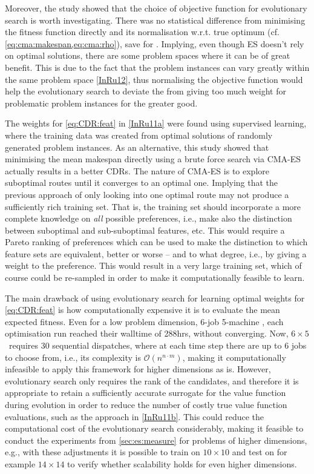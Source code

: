 Moreover, the study showed that the choice of objective function  for 
evolutionary search is worth investigating. There was no statistical difference 
from minimising the fitness function directly and its normalisation w.r.t. true 
optimum (cf. \cref{eq:cma:makespan,eq:cma:rho}), save for . 
Implying, even though ES doesn't rely on optimal solutions, there are some 
problem spaces where it can be of great benefit. This is due to the fact that 
the problem instances can vary greatly within the same problem space 
\cref{InRu12}, thus normalising the objective function would help the 
evolutionary search to deviate the from giving too much weight for problematic 
problem instances for the greater good.

The weights for \cref{eq:CDR:feat} in \cref{InRu11a} were found using 
supervised learning, where the training data was created from optimal solutions 
of randomly generated problem instances. As an alternative, this study showed  
that minimising the mean makespan directly using a brute force search via 
CMA-ES actually results in a better CDRs. The nature of CMA-ES is to explore 
suboptimal routes until it converges to an optimal one. Implying that the 
previous approach of only looking into one optimal route may not produce a 
sufficiently rich training set. That is, the training set should incorporate a 
more complete knowledge on \emph{all} possible preferences, i.e., make also the 
distinction between suboptimal and sub-suboptimal features, etc.  This would 
require a Pareto ranking of preferences which can be used to make the 
distinction to which feature sets are equivalent, better or worse -- and to 
what degree, i.e., by giving a weight to the preference. This would result in a 
very large training set, which of course could be re-sampled in order to make 
it computationally feasible to learn.

The main drawback of using evolutionary search for learning optimal weights for 
\cref{eq:CDR:feat} is how computationally expensive it is to evaluate the mean 
expected fitness. Even for a low problem dimension, 6-job 5-machine \JSP , each 
optimisation run reached their walltime of 288hrs, without converging. Now, 
$6\times5$ \JSP\ requires 30 sequential dispatches, where at each time step 
there are up to $6$ jobs to choose from, i.e., its complexity is 
$\mathcal{O}(n^{n\cdot m})$, making it computationally infeasible to apply this 
framework for higher dimensions as is. 
However, evolutionary search only requires the rank of the candidates, and 
therefore it is appropriate to retain a sufficiently accurate surrogate for the 
value function during evolution in order to reduce the number of costly true 
value function evaluations, such as the approach in \cref{InRu11b}. This could 
reduce the computational cost of the evolutionary search considerably, making 
it feasible to conduct the experiments from \cref{sec:es:measure} for problems 
of higher dimensions, e.g., with these adjustments it is possible to train on 
$10\times10$ and test on for example $14\times14$ to verify whether scalability 
holds for even higher dimensions.  





